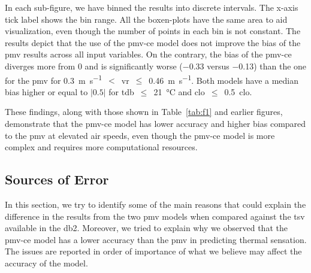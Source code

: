 In each sub-figure, we have binned the results into discrete intervals.
The x-axis tick label shows the bin range.
All the boxen-plots have the same area to aid visualization, even though the number of points in each bin is not constant.
The results depict that the use of the \ac{pmv-ce} model does not improve the bias of the \ac{pmv} results across all input variables.
On the contrary, the bias of the \ac{pmv-ce} diverges more from 0 and is significantly worse (\num{-.33} versus \num{-0.13}) than the one for the \ac{pmv} for \qty{0.3}{\m\per\s}~$<$~\ac{vr}~$\leq$~\qty{0.46}{\m\per\s}.
Both models have a median bias higher or equal to $\lvert0.5\lvert$ for \ac{tdb}~$\leq$~\qty{21}{\celsius} and \ac{clo}~$\leq$~\qty{.5}{clo}.

These findings, along with those shown in Table~\ref{tab:f1} and earlier figures, demonstrate that the \ac{pmv-ce} model has lower accuracy and higher bias compared to the \ac{pmv} at elevated air speeds, even though the \ac{pmv-ce} model is more complex and requires more computational resources.

\subsection{Sources of Error}\label{subsec:sources-of-error}
In this section, we try to identify some of the main reasons that could explain the difference in the results from the two \ac{pmv} models when compared against the \ac{tsv} available in the \ac{db2}.
Moreover, we tried to explain why we observed that the \ac{pmv-ce} model has a lower accuracy than the \ac{pmv} in predicting thermal sensation.
The issues are reported in order of importance of what we believe may affect the accuracy of the model.

